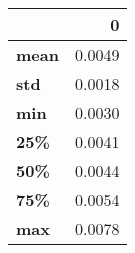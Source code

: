\begin{tabular}{lr}
\toprule
{} &       0 \\
\midrule
\textbf{mean} &  0.0049 \\
\textbf{std } &  0.0018 \\
\textbf{min } &  0.0030 \\
\textbf{25\% } &  0.0041 \\
\textbf{50\% } &  0.0044 \\
\textbf{75\% } &  0.0054 \\
\textbf{max } &  0.0078 \\
\bottomrule
\end{tabular}
